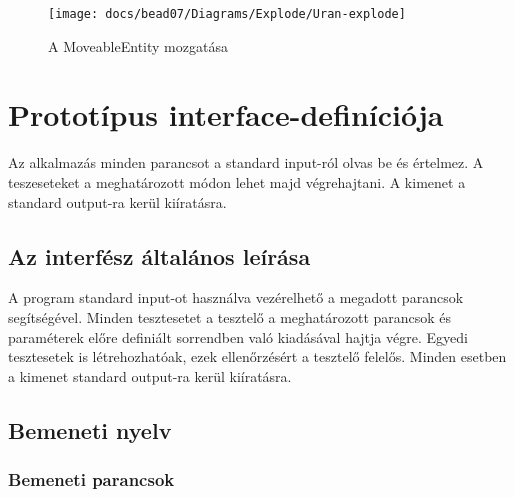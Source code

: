 \documentclass[../../projlab]{subfiles}
\begin{document}
\begin{figure}[H] 
    \centering 
    \texttt{[image: docs/bead07/Diagrams/Explode/Uran-explode]} 
    \caption{A MoveableEntity mozgatása} 
\end{figure} 


\section{Prototípus interface-definíciója}

Az alkalmazás minden parancsot a standard input-ról olvas be és értelmez. A teszeseteket a meghatározott módon lehet majd végrehajtani.
A kimenet a standard output-ra kerül kiíratásra.
\subsection{Az interfész általános leírása}

A program standard input-ot használva vezérelhető a megadott parancsok segítségével. Minden tesztesetet a tesztelő a meghatározott parancsok és paraméterek előre definiált sorrendben való kiadásával hajtja végre. Egyedi tesztesetek is létrehozhatóak, ezek ellenőrzésért a tesztelő felelős.
Minden esetben a kimenet standard output-ra kerül kiíratásra.
\subsection{Bemeneti nyelv}

\subsubsection{Bemeneti parancsok}
\end{document}
